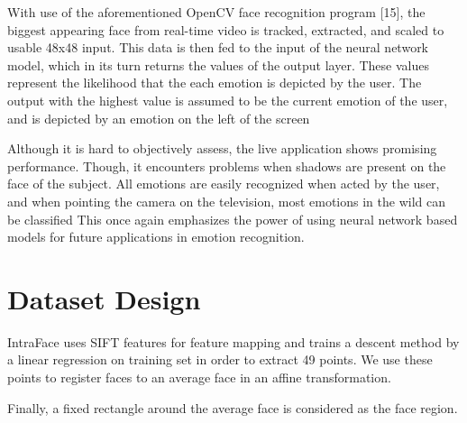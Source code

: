 With use of the aforementioned OpenCV face recognition program [15], the biggest appearing face from real-time video is tracked, extracted, and scaled to usable 48x48 input. This data is then fed to the input of the neural network model, which in its turn returns the values of the output layer. These values represent the likelihood that the each emotion is depicted by the user. The output with the highest value is assumed to be the current emotion of the user, and is depicted by an emotion on the left of the screen

Although it is hard to objectively assess, the live application shows promising performance. Though, it encounters problems when shadows are present on the face of the subject. All emotions are easily recognized when acted by the user, and when pointing the camera on the television, most emotions in the wild can be classified This once again emphasizes the power of using neural network based models for future applications in emotion recognition.

\section{Dataset Design}
IntraFace uses SIFT features for feature mapping and trains a descent method by a linear regression on training set in order to extract 49 points. We use these points to register faces to an average face in an affine transformation.

Finally, a fixed rectangle around the average face is considered as the face region.

